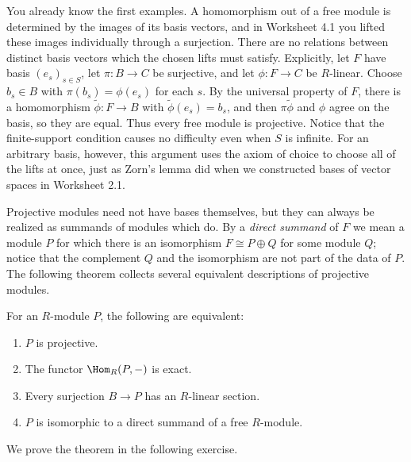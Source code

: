 \documentclass[12pt,reqno]{amsart}
\begin{document}
You already know the first examples. A homomorphism out of a free module is determined by the images of its basis vectors, and in Worksheet 4.1 you lifted these images individually through a surjection. There are no relations between distinct basis vectors which the chosen lifts must satisfy. Explicitly, let $F$ have basis $(e_s)_{s\in S}$, let $\pi:B\to C$ be surjective, and let $\phi:F\to C$ be $R$-linear. Choose $b_s\in B$ with $\pi(b_s)=\phi(e_s)$ for each $s$. By the universal property of $F$, there is a homomorphism $\widetilde\phi:F\to B$ with $\widetilde\phi(e_s)=b_s$, and then $\pi\widetilde\phi$ and $\phi$ agree on the basis, so they are equal. Thus every free module is projective. Notice that the finite-support condition causes no difficulty even when $S$ is infinite. For an arbitrary basis, however, this argument uses the axiom of choice to choose all of the lifts at once, just as Zorn's lemma did when we constructed bases of vector spaces in Worksheet 2.1.

Projective modules need not have bases themselves, but they can always be realized as summands of modules which do. By a \emph{direct summand} of $F$ we mean a module $P$ for which there is an isomorphism $F\cong P\oplus Q$ for some module $Q$; notice that the complement $Q$ and the isomorphism are not part of the data of $P$. The following theorem collects several equivalent descriptions of projective modules.

\begin{theorem}
For an $R$-module $P$, the following are equivalent:
\begin{enumerate}
\item $P$ is projective.
\item The functor $\Hom_R(P,-)$ is exact.
\item Every surjection $B\to P$ has an $R$-linear section.
\item $P$ is isomorphic to a direct summand of a free $R$-module.
\end{enumerate}
\end{theorem}

We prove the theorem in the following exercise.

\hrulefill
\end{document}
